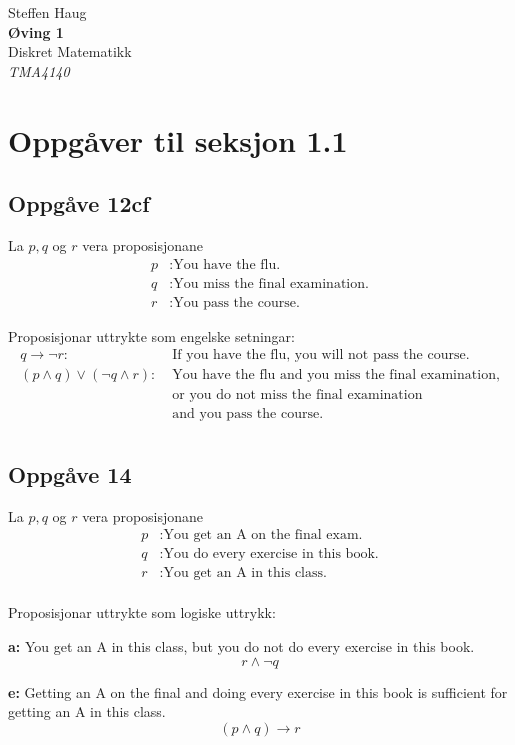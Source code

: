 \documentclass[a4paper, 11pt]{article}
\author{\forfatter}
\date{}
\newcommand{\tittel}{Øving 1}
\newcommand{\fag}{Diskret Matematikk}
\newcommand{\fagkode}{TMA4140}
\newcommand{\forfatter}{Steffen Haug}
\newcommand{\deloppg}[1]{\vspace{1mm}\noindent \textbf{\themecolor{#1:}}}
\newcommand{\themeshade}{Mahogany}
\newcommand{\themecolor}[1]{\textcolor{\themeshade}{#1}}
\newcommand*{\titleTH}{\begingroup %
\raggedleft %
\vspace*{\baselineskip} %

{\Large \forfatter}\\[0.167\textheight] %

{\LARGE\bfseries \tittel}\\[\baselineskip] %

{\themecolor{\Huge \fag}}\\[\baselineskip] %

{\Large \textit{\fagkode}}\par %

\vfill %
\endgroup}
\begin{document}
\pagestyle{empty}
\titleTH
\newpage\pagestyle{fancy}

\section*{Oppgåver til seksjon 1.1} %

\subsection*{Oppgåve 12cf}
La $p, q$ og $r$ vera proposisjonane
\begin{align*}
    p&: \text{You have the flu.} \\
    q&: \text{You miss the final examination.} \\
    r&: \text{You pass the course.}
\end{align*}

\noindent Proposisjonar uttrykte som engelske setningar:
\begin{align*}
    q \rightarrow \neg r: &\;\text{If you have the flu, you will not pass the course.} \\
    (p \land q) \lor (\neg q \land r): &\;\text{You have the flu and you miss the final examination,}\\ 
    &\;\text{or you do not miss the final examination}\\
    &\;\text{and you pass the course.} \\
\end{align*}

\subsection*{Oppgåve 14}
La $p,q$ og $r$ vera proposisjonane
\begin{align*}
    p&: \text{You get an A on the final exam.}\\
    q&: \text{You do every exercise in this book.}\\
    r&: \text{You get an A in this class.}\\
\end{align*}

\noindent \themecolor{Proposisjonar uttrykte som logiske uttrykk:}

\deloppg{a} You get an A in this class, but you do not do every exercise in this book.
\[
    r \land \neg q    
\]

\deloppg{e} Getting an A on the final and doing every exercise in this book
is sufficient for getting an A in this class.
\[
    (p \land q) \rightarrow r
\]
\end{document}
